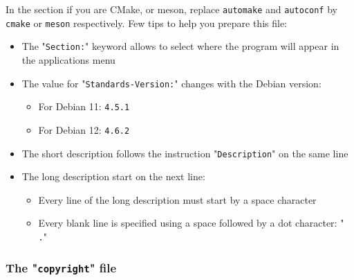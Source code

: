 \noindent In the  section if you are CMake, or meson, replace \texttt{automake} and \texttt{autoconf} by \texttt{cmake} or \texttt{meson} respectively. 
\newpage
\noindent Few tips to help you prepare this file:
\begin{itemize}
\item The "\texttt{Section:}" keyword allows to select where the program will appear in the applications menu
\item The value for "\texttt{Standards-Version:}" changes with the Debian version:
\begin{itemize} 
\item For Debian 11: \texttt{4.5.1}
\item For Debian 12: \texttt{4.6.2}
\end{itemize}
\item The short description follows the instruction "\texttt{Description}" on the same line
\item The long description start on the next line: 
\begin{itemize}
\item Every line of the long description must start by a space character
\item Every blank line is specified using a space followed by a dot character: "\texttt{ .}"
\end{itemize}
\end{itemize}

\subsubsection{The "\texttt{copyright}" file}

